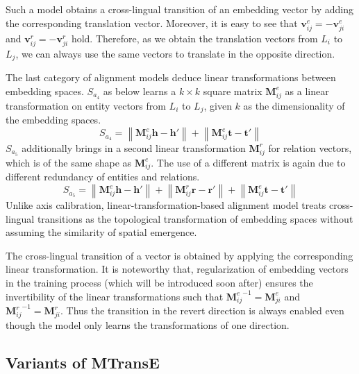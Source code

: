 \documentclass{article}
\def\inv{\vspace{-0.1cm}}
\begin{document}
Such a model obtains a cross-lingual transition of an embedding vector by adding the corresponding translation vector.
Moreover, it is easy to see that $\mathbf{v}_{ij}^{e} = -\mathbf{v}_{ji}^{e}$ and $\mathbf{v}_{ij}^{r} = - \mathbf{v}_{ji}^{r}$ hold. Therefore, as we obtain the translation vectors from $L_i$ to $L_j$, we can always use the same vectors to translate in the opposite direction.

The last category of alignment models deduce linear transformations between embedding spaces. $S_{a_4}$ as below learns a $k\times k$ square matrix $\mathbf{M}_{ij}^{e}$ as a linear transformation on entity vectors from $L_i$ to $L_j$, given $k$ as the dimensionality of the embedding spaces.
\begin{equation*}
S_{a_{4}} = \left \| \mathbf{M}_{ij}^{e} \mathbf{h} - \mathbf{h}' \right \| + \left \| \mathbf{M}_{ij}^{e} \mathbf{t} - \mathbf{t}' \right \|
\end{equation*}
$S_{a_5}$ additionally brings in a second linear transformation $\mathbf{M}_{ij}^{r}$ for relation vectors, which is of the same shape as $\mathbf{M}_{ij}^{e}$. The use of a different matrix is again due to different redundancy of entities and relations.
\begin{equation*}
S_{a_{5}} = \left \| \mathbf{M}_{ij}^{e} \mathbf{h} - \mathbf{h}' \right \| + \left \| \mathbf{M}_{ij}^{r} \mathbf{r} - \mathbf{r}' \right \| + \left \| \mathbf{M}_{ij}^{e} \mathbf{t} - \mathbf{t}' \right \|
\end{equation*}
Unlike axis calibration, linear-transformation-based alignment model treats cross-lingual transitions as the topological transformation of embedding spaces without assuming the similarity of spatial emergence. \par

The cross-lingual transition of a vector is obtained by applying the corresponding linear transformation. It is noteworthy that, regularization of embedding vectors in the training process (which will be introduced soon after) ensures the invertibility
of the linear transformations such that ${\mathbf{M}_{ij}^{e}}^{-1} = {\mathbf{M}_{ji}^{e}}$ and ${\mathbf{M}_{ij}^{r}}^{-1} = {\mathbf{M}_{ji}^{r}}$. Thus the transition in the revert direction is always enabled even though the model only learns the transformations of one direction.

\inv
\subsection{Variants of MTransE}
\end{document}

